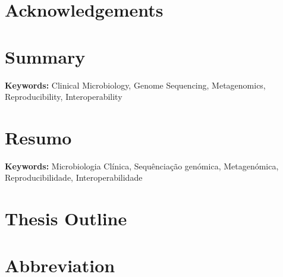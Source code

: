 \documentclass[12pt,a4paper,twoside,openright]{book}
\providecommand{\keywords}[1]{\textbf{Keywords:} #1}
\begin{document}
\begin{sloppy}
\chapter*{Acknowledgements}

\clearpage \thispagestyle{empty}\mbox{}\clearpage

\newpage
\thispagestyle{plain}
\chapter*{Summary}


\keywords{Clinical Microbiology, Genome Sequencing, Metagenomics, Reproducibility, Interoperability}
\clearpage \thispagestyle{empty}\mbox{}\clearpage

\newpage
\thispagestyle{plain}
\chapter*{Resumo}


\keywords{Microbiologia Clínica, Sequênciação genómica, Metagenómica, Reproducibilidade, Interoperabilidade}
\clearpage \thispagestyle{empty}\mbox{}\clearpage

\newpage
\thispagestyle{plain}
\chapter*{Thesis Outline}

\clearpage \thispagestyle{empty}\mbox{}\clearpage

\newpage
\thispagestyle{plain}
\chapter*{Abbreviation}

\clearpage \thispagestyle{empty}\mbox{}\clearpage


\end{sloppy}
\end{document}
